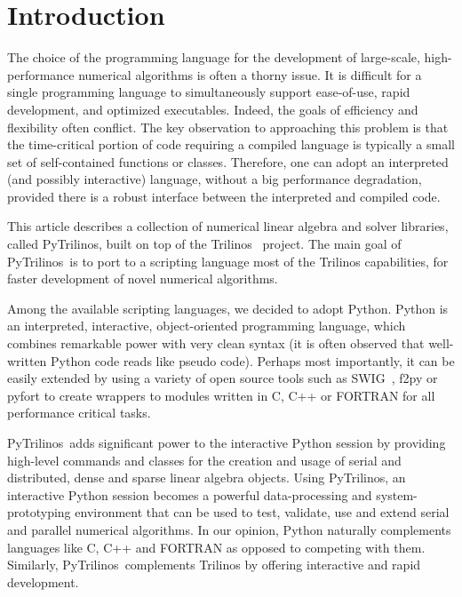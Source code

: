 \documentclass{llncs}
\newcommand{\PyTrilinos}{{\sc PyTrilinos}}
\begin{document}
\section{Introduction}
\label{sec:intro}

The choice of the programming language for the development of
large-scale, high-performance numerical algorithms is often a thorny
issue. 
It is difficult for a single programming
language to simultaneously support ease-of-use, rapid development, and
optimized executables.  Indeed, the goals of efficiency and
flexibility often conflict.  The key observation to approaching this
problem is that the time-critical portion of code requiring a compiled
language is typically a small set of self-contained functions or
classes.  Therefore, one can adopt an interpreted (and possibly
interactive) language, without a big performance degradation, provided
there is a robust interface between the interpreted and compiled code.

This article describes a collection of numerical linear algebra and
solver libraries, called \PyTrilinos, built on top of the
Trilinos~\cite{Trilinos-Overview}
project.  The main goal of \PyTrilinos\ is to port to a scripting
language most of the Trilinos capabilities, for faster development of novel
numerical algorithms.

Among the available scripting languages, we decided to adopt Python.  Python
is an interpreted, interactive, object-oriented programming language, which
combines remarkable power with very clean syntax (it is often observed that
well-written Python code reads like pseudo code).  Perhaps most importantly,
it can be easily extended by using a variety of open source tools such as
SWIG~\cite{swig}, f2py or pyfort to create wrappers to modules written in C, C++ or
FORTRAN for all performance critical tasks.

\PyTrilinos\ adds
significant power to the interactive Python session by providing
high-level commands and classes for the creation and usage of serial
and distributed, dense and sparse linear algebra objects.  Using
\PyTrilinos, an interactive Python session becomes a powerful
data-processing and system-prototyping environment that can be used to
test, validate, use and extend serial and parallel numerical
algorithms.  In our opinion, Python naturally complements languages
like C, C++ and FORTRAN as opposed to competing with them.  Similarly,
\PyTrilinos\ complements Trilinos by offering interactive and rapid
development.
\end{document}
